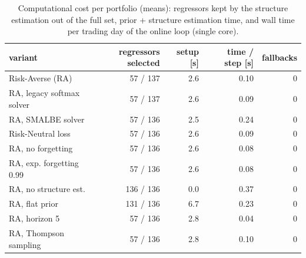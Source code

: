 \begin{table}[ht!]
\centering
\small
\setlength{\tabcolsep}{4pt}
\begin{tabular}{lrrrr}
\hline
variant & regressors selected & setup [s] & time / step [s] & fallbacks \\
\hline
Risk-Averse (RA) & 57 / 137 & 2.6 & 0.10 & 0 \\
RA, legacy softmax solver & 57 / 137 & 2.6 & 0.09 & 0 \\
RA, SMALBE solver & 57 / 136 & 2.5 & 0.24 & 0 \\
Risk-Neutral loss & 57 / 136 & 2.6 & 0.09 & 0 \\
RA, no forgetting & 57 / 136 & 2.6 & 0.08 & 0 \\
RA, exp. forgetting 0.99 & 57 / 136 & 2.6 & 0.08 & 0 \\
RA, no structure est. & 136 / 136 & 0.0 & 0.37 & 0 \\
RA, flat prior & 131 / 136 & 6.7 & 0.23 & 0 \\
RA, horizon 5 & 57 / 136 & 2.8 & 0.04 & 0 \\
RA, Thompson sampling & 57 / 136 & 2.8 & 0.10 & 0 \\
\hline
\end{tabular}
\caption{Computational cost per portfolio (means): regressors kept by the structure estimation out of the full set, prior + structure estimation time, and wall time per trading day of the online loop (single core).}
\label{tab:runtime}
\end{table}
